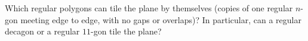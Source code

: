 Which regular polygons can tile the plane by themselves (copies of one regular $n$-gon meeting edge to edge, with no gaps or overlaps)? In particular, can a regular decagon or a regular $11$-gon tile the plane?
